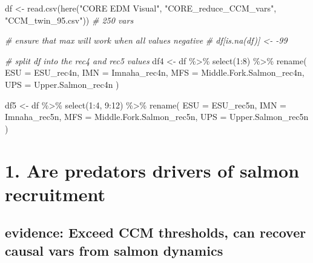 \documentclass[
]{article}
\newenvironment{Shaded}{\begin{snugshade}}{\end{snugshade}}
\newcommand{\AttributeTok}[1]{\textcolor[rgb]{0.77,0.63,0.00}{#1}}
\newcommand{\CommentTok}[1]{\textcolor[rgb]{0.56,0.35,0.01}{\textit{#1}}}
\newcommand{\DecValTok}[1]{\textcolor[rgb]{0.00,0.00,0.81}{#1}}
\newcommand{\FunctionTok}[1]{\textcolor[rgb]{0.00,0.00,0.00}{#1}}
\newcommand{\NormalTok}[1]{#1}
\newcommand{\OtherTok}[1]{\textcolor[rgb]{0.56,0.35,0.01}{#1}}
\newcommand{\SpecialCharTok}[1]{\textcolor[rgb]{0.00,0.00,0.00}{#1}}
\newcommand{\StringTok}[1]{\textcolor[rgb]{0.31,0.60,0.02}{#1}}
\begin{document}
\begin{Shaded}
\begin{Highlighting}[]
\NormalTok{df }\OtherTok{\textless{}{-}}  \FunctionTok{read.csv}\NormalTok{(}\FunctionTok{here}\NormalTok{(}\StringTok{"CORE EDM Visual"}\NormalTok{, }\StringTok{"CORE\_reduce\_CCM\_vars"}\NormalTok{, }\StringTok{"CCM\_twin\_95.csv"}\NormalTok{))}
\CommentTok{\# 250 vars}

\CommentTok{\# ensure that max will work when all values negative}
\CommentTok{\# df[is.na(df)] \textless{}{-} {-}99}

\CommentTok{\# split df into the rec4 and rec5 values}
\NormalTok{df4 }\OtherTok{\textless{}{-}}\NormalTok{ df }\SpecialCharTok{\%\textgreater{}\%} 
  \FunctionTok{select}\NormalTok{(}\DecValTok{1}\SpecialCharTok{:}\DecValTok{8}\NormalTok{) }\SpecialCharTok{\%\textgreater{}\%} 
  \FunctionTok{rename}\NormalTok{(}
    \AttributeTok{ESU =}\NormalTok{ ESU\_rec4n,}
    \AttributeTok{IMN =}\NormalTok{ Imnaha\_rec4n,}
    \AttributeTok{MFS =}\NormalTok{ Middle.Fork.Salmon\_rec4n, }
    \AttributeTok{UPS =}\NormalTok{ Upper.Salmon\_rec4n}
\NormalTok{  )}

\NormalTok{df5 }\OtherTok{\textless{}{-}}\NormalTok{ df }\SpecialCharTok{\%\textgreater{}\%} 
  \FunctionTok{select}\NormalTok{(}\DecValTok{1}\SpecialCharTok{:}\DecValTok{4}\NormalTok{, }\DecValTok{9}\SpecialCharTok{:}\DecValTok{12}\NormalTok{) }\SpecialCharTok{\%\textgreater{}\%} 
  \FunctionTok{rename}\NormalTok{(}
    \AttributeTok{ESU =}\NormalTok{ ESU\_rec5n,}
    \AttributeTok{IMN =}\NormalTok{ Imnaha\_rec5n,}
    \AttributeTok{MFS =}\NormalTok{ Middle.Fork.Salmon\_rec5n, }
    \AttributeTok{UPS =}\NormalTok{ Upper.Salmon\_rec5n}
\NormalTok{  )}
\end{Highlighting}
\end{Shaded}

\hypertarget{are-predators-drivers-of-salmon-recruitment}{%
\section{1. Are predators drivers of salmon
recruitment}\label{are-predators-drivers-of-salmon-recruitment}}

\hypertarget{evidence-exceed-ccm-thresholds-can-recover-causal-vars-from-salmon-dynamics}{%
\subsection{evidence: Exceed CCM thresholds, can recover causal vars
from salmon
dynamics}\label{evidence-exceed-ccm-thresholds-can-recover-causal-vars-from-salmon-dynamics}}
\end{document}
